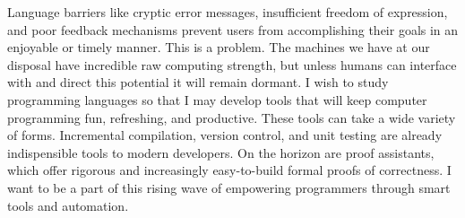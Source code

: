 \documentclass{article}
\begin{document}
Language barriers like cryptic error messages, insufficient freedom of expression, and poor feedback mechanisms prevent users from accomplishing their goals in an enjoyable or timely manner.
This is a problem.
The machines we have at our disposal have incredible raw computing strength, but unless humans can interface with and direct this potential it will remain dormant. 
I wish to study programming languages so that I may develop tools that will keep computer programming fun, refreshing, and productive.
These tools can take a wide variety of forms. 
Incremental compilation, version control, and unit testing are already indispensible tools to modern developers.
On the horizon are proof assistants, which offer rigorous and increasingly easy-to-build formal proofs of correctness.
I want to be a part of this rising wave of empowering programmers through smart tools and automation.

\end{document}
